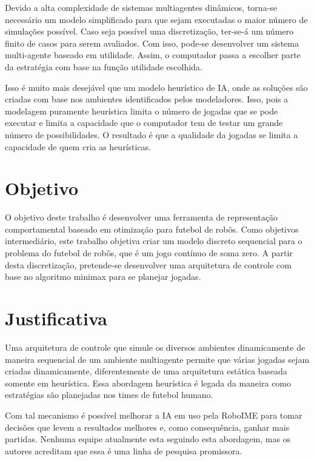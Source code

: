 Devido a alta complexidade de sistemas multiagentes dinâmicos, torna-se
necessário um modelo simplificado para que sejam executadas o maior número de
simulações possível.  Caso seja possível uma discretização, ter-se-á um número
finito de casos para serem avaliados. Com isso, pode-se desenvolver um sistema
multi-agente baseado em utilidade. Assim, o computador passa a escolher parte
da estratégia com base na função utilidade escolhida.

Isso é muito mais desejável que um modelo heurístico de IA, onde as soluções são
criadas com base nos ambientes identificados pelos modeladores. Isso, pois a
modelagem puramente heurística limita o número de jogadas que se pode executar e
limita a capacidade que o computador tem de testar um grande número de possibilidades.
O resultado é que a qualidade da jogadas se limita a capacidade de quem cria as
heurísticas.

\section{Objetivo}

O objetivo deste trabalho é desenvolver uma ferramenta de representação
comportamental baseado em otimização para futebol de robôs.
Como objetivos intermediário, este trabalho objetiva criar um modelo discreto
sequencial para o problema do futebol de robôs, que é um jogo contínuo de soma
zero.  A partir desta discretização, pretende-se desenvolver uma arquitetura de
controle com base no algoritmo minimax para se planejar jogadas.

\section{Justificativa}

Uma arquitetura de controle que simule os diversos ambientes dinamicamente de
maneira sequencial de um ambiente multiagente permite que várias jogadas sejam
criadas dinamicamente, diferentemente de uma arquitetura estática baseada somente
em heurística. Essa abordagem heurística é legada da maneira como estratégias
são planejadas nos times de futebol humano.

Com tal mecanismo é possível melhorar a IA em uso pela RoboIME para tomar
decisões que levem a resultados melhores e, como consequência, ganhar mais
partidas. Nenhuma equipe atualmente esta seguindo esta abordagem, mas os autores
acreditam que essa é uma linha de pesquisa promissora.

